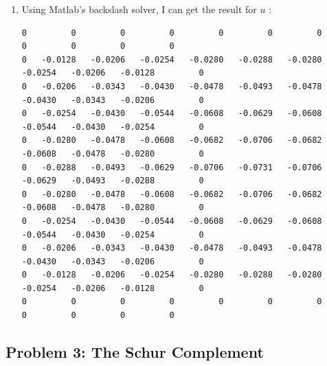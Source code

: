 \documentclass{article}
\begin{document}
\begin{enumerate}
\begin{lstlisting}
     else
         % we are NOT on a boundary
         f(row) = 1/n^2;
            A(row, G(i,j+1  )) = 1;             % Put the coefficients to the corresponding entry of matrix A. 
            A(row, G(i+1,  j)) = 1; 
            A(row, G(i+1,  j+1  )) = -4; 
            A(row, G(i+2,j+1  )) = 1 ; 
            A(row, G(i+1,  j+2)) = 1; 
        % end
            
     end
 end
end
u = A\f;
\end{lstlisting}


\item 
Using Matlab's backslash solver, I can get the result for $u$ : \\
\begingroup
\fontsize{8pt}{12pt}\selectfont
\begin{verbatim}
0         0         0         0         0         0         0         0         0         0         0
0   -0.0128   -0.0206   -0.0254   -0.0280   -0.0288   -0.0280   -0.0254   -0.0206   -0.0128         0
0   -0.0206   -0.0343   -0.0430   -0.0478   -0.0493   -0.0478   -0.0430   -0.0343   -0.0206         0
0   -0.0254   -0.0430   -0.0544   -0.0608   -0.0629   -0.0608   -0.0544   -0.0430   -0.0254         0
0   -0.0280   -0.0478   -0.0608   -0.0682   -0.0706   -0.0682   -0.0608   -0.0478   -0.0280         0
0   -0.0288   -0.0493   -0.0629   -0.0706   -0.0731   -0.0706   -0.0629   -0.0493   -0.0288         0
0   -0.0280   -0.0478   -0.0608   -0.0682   -0.0706   -0.0682   -0.0608   -0.0478   -0.0280         0
0   -0.0254   -0.0430   -0.0544   -0.0608   -0.0629   -0.0608   -0.0544   -0.0430   -0.0254         0
0   -0.0206   -0.0343   -0.0430   -0.0478   -0.0493   -0.0478   -0.0430   -0.0343   -0.0206         0
0   -0.0128   -0.0206   -0.0254   -0.0280   -0.0288   -0.0280   -0.0254   -0.0206   -0.0128         0
0         0         0         0         0         0         0         0         0         0         0
\end{verbatim}
\endgroup



\end{enumerate} 


\hypertarget{}{}
\subsection*{{Problem 3: The Schur Complement}}
\label{}
\end{document}
